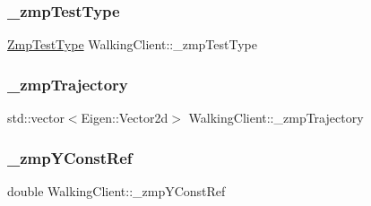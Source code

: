 \hypertarget{classWalkingClient_a14576258d7fed1b36919145f1b56d74c}{}\label{classWalkingClient_a14576258d7fed1b36919145f1b56d74c} 
\subsubsection{\texorpdfstring{\+\_\+zmp\+Test\+Type}{\_zmpTestType}}
{\footnotesize\ttfamily \hyperlink{WalkingClient_8h_afc01479a47f5a87462a54b6a9e11fffa}{Zmp\+Test\+Type} Walking\+Client\+::\+\_\+zmp\+Test\+Type\hspace{0.3cm}{\ttfamily [private]}}

\hypertarget{classWalkingClient_a8b8a3d7fe6e12d49a0e72d05f9938564}{}\label{classWalkingClient_a8b8a3d7fe6e12d49a0e72d05f9938564} 
\subsubsection{\texorpdfstring{\+\_\+zmp\+Trajectory}{\_zmpTrajectory}}
{\footnotesize\ttfamily std\+::vector$<$Eigen\+::\+Vector2d$>$ Walking\+Client\+::\+\_\+zmp\+Trajectory\hspace{0.3cm}{\ttfamily [private]}}

\hypertarget{classWalkingClient_a6cba3194816a0be78a8b17d539806115}{}\label{classWalkingClient_a6cba3194816a0be78a8b17d539806115} 
\subsubsection{\texorpdfstring{\+\_\+zmp\+Y\+Const\+Ref}{\_zmpYConstRef}}
{\footnotesize\ttfamily double Walking\+Client\+::\+\_\+zmp\+Y\+Const\+Ref\hspace{0.3cm}{\ttfamily [private]}}

\hypertarget{classWalkingClient_a88ee63ff6a341eccd458d24700383457}{}\label{classWalkingClient_a88ee63ff6a341eccd458d24700383457} 
